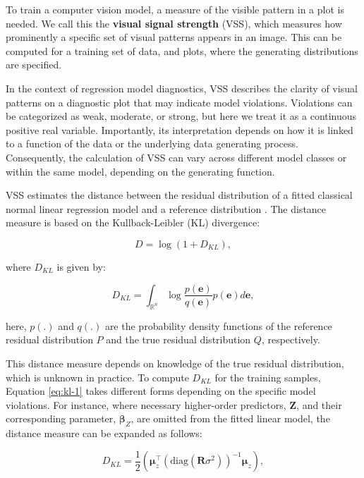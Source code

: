 \documentclass[
doublespace,
  times]{anzsauth}
\begin{document}
To train a computer vision model, a measure of the visible pattern in a
plot is needed. We call this the \textbf{visual signal strength} (VSS),
which measures how prominently a specific set of visual patterns appears
in an image. This can be computed for a training set of data, and plots,
where the generating distributions are specified.

In the context of regression model diagnostics, VSS describes the
clarity of visual patterns on a diagnostic plot that may indicate model
violations. Violations can be categorized as weak, moderate, or strong,
but here we treat it as a continuous positive real variable.
Importantly, its interpretation depends on how it is linked to a
function of the data or the underlying data generating process.
Consequently, the calculation of VSS can vary across different model
classes or within the same model, depending on the generating function.

VSS estimates the distance between the residual distribution of a fitted
classical normal linear regression model and a reference distribution
\citep[see][for details]{li2024automated}. The distance measure is based
on the Kullback-Leibler (KL) divergence:

\begin{equation*} \label{eq:kl-0}
D = \log\left(1 + D_{KL}\right),
\end{equation*}

where \(D_{KL}\) is given by:

\begin{equation} \label{eq:kl-1}
D_{KL} = \int_{\mathbb{R}^{n}}\log\frac{p(\boldsymbol{e})}{q(\boldsymbol{e})}p(\boldsymbol{e})d\boldsymbol{e},
\end{equation}

here, \(p(.)\) and \(q(.)\) are the probability density functions of the
reference residual distribution \(P\) and the true residual distribution
\(Q\), respectively.

This distance measure depends on knowledge of the true residual
distribution, which is unknown in practice. To compute \(D_{KL}\) for
the training samples, Equation \ref{eq:kl-1} takes different forms
depending on the specific model violations. For instance, where
necessary higher-order predictors, \(\boldsymbol{Z}\), and their
corresponding parameter, \(\boldsymbol{\beta}_Z\), are omitted from the
fitted linear model, the distance measure can be expanded as follows:

\begin{equation*} \label{eq:kl-2}
D_{KL} = \frac{1}{2}\left(\boldsymbol{\mu}_z^\top(\text{diag}(\boldsymbol{R}\sigma^2))^{-1}\boldsymbol{\mu}_z\right),
\end{equation*}
\end{document}
